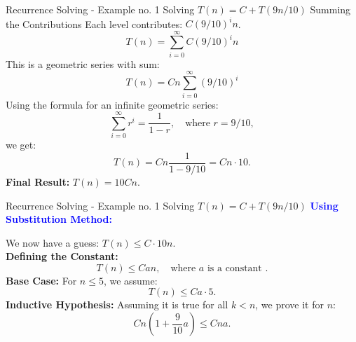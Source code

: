 \begin{frame}{Recurrence Solving - Example no. 1}
    {Solving $T(n) = C + T(9n/10)$}
    {Summing the Contributions}
    Each level contributes: $C(9/10)^i n$.
    \begin{equation*}
        T(n) = \sum_{i=0}^{\infty} C(9/10)^i n
    \end{equation*}
    This is a geometric series with sum:
    \begin{equation*}
        T(n) = C n \sum_{i=0}^{\infty} (9/10)^i
    \end{equation*}
    Using the formula for an infinite geometric series:
    \begin{equation*}
        \sum_{i=0}^{\infty} r^i = \frac{1}{1 - r}, \quad \text{where } r = 9/10,
    \end{equation*}
    we get:
    \begin{equation*}
        T(n) = C n \frac{1}{1 - 9/10} = C n \cdot 10.
    \end{equation*}
    \textbf{Final Result:} $T(n) = 10 C n$.
\end{frame}

\begin{frame}{Recurrence Solving - Example no. 1}
    {Solving $T(n) = C + T(9n/10)$}
    \textbf{\textcolor{blue}{Using Substitution Method:}}\\
    \vspace{0.2cm}
    
    We now have a guess: $T(n) \leq C \cdot 10 n$.\\
    \textbf{Defining the Constant:}
    \begin{equation*}
        T(n) \leq C a n, \quad \text{where } a \text{ is a constant } .
    \end{equation*}
    \textbf{Base Case:} For $n \leq 5$, we assume:
    \begin{equation*}
        T(n) \leq C a \cdot 5.
    \end{equation*}
    \textbf{Inductive Hypothesis:} Assuming it is true for all $k < n$, we prove it for $n$:
    \begin{equation*}
        Cn \left( 1 + \frac{9}{10} a \right) \leq Cna.
    \end{equation*}
\end{frame}

